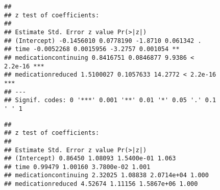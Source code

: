 \documentclass[]{article}
\newenvironment{Shaded}{\begin{snugshade}}{\end{snugshade}}
\newcommand{\DataTypeTok}[1]{\textcolor[rgb]{0.13,0.29,0.53}{#1}}
\newcommand{\DecValTok}[1]{\textcolor[rgb]{0.00,0.00,0.81}{#1}}
\newcommand{\KeywordTok}[1]{\textcolor[rgb]{0.13,0.29,0.53}{\textbf{#1}}}
\newcommand{\NormalTok}[1]{#1}
\newcommand{\OperatorTok}[1]{\textcolor[rgb]{0.81,0.36,0.00}{\textbf{#1}}}
\newcommand{\OtherTok}[1]{\textcolor[rgb]{0.56,0.35,0.01}{#1}}
\newcommand{\StringTok}[1]{\textcolor[rgb]{0.31,0.60,0.02}{#1}}
\begin{document}
\begin{Shaded}
\end{Shaded}

\begin{verbatim}
##
## z test of coefficients:
##
## Estimate Std. Error z value Pr(>|z|)
## (Intercept) -0.1456010 0.0778190 -1.8710 0.061342 .
## time -0.0052268 0.0015956 -3.2757 0.001054 **
## medicationcontinuing 0.8416751 0.0846877 9.9386 <
2.2e-16 ***
## medicationreduced 1.5100027 0.1057633 14.2772 < 2.2e-16
***
## ---
## Signif. codes: 0 '***' 0.001 '**' 0.01 '*' 0.05 '.' 0.1
' ' 1
\end{verbatim}

\begin{Shaded}
\end{Shaded}

\begin{verbatim}
##
## z test of coefficients:
##
## Estimate Std. Error z value Pr(>|z|)
## (Intercept) 0.86450 1.08093 1.5400e-01 1.063
## time 0.99479 1.00160 3.7800e-02 1.001
## medicationcontinuing 2.32025 1.08838 2.0714e+04 1.000
## medicationreduced 4.52674 1.11156 1.5867e+06 1.000
\end{verbatim}
\end{document}
